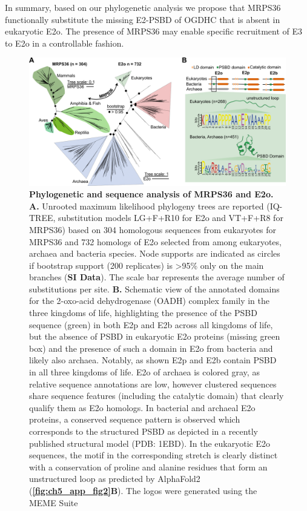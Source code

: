 In summary, based on our phylogenetic analysis we propose that MRPS36 functionally substitute the missing E2-PSBD of OGDHC that is absent in eukaryotic E2o. The presence of MRPS36 may enable specific recruitment of E3 to E2o in a controllable fashion.
\raggedbottom
\begin{figure}[b!]
    \centering
    \includegraphics[]{Chapter.5/Figures/Figure3.png}
    \caption{\textbf{Phylogenetic and sequence analysis of MRPS36 and E2o.} \textbf{A.} Unrooted maximum likelihood phylogeny trees are reported (IQ-TREE, substitution models LG+F+R10 for E2o and VT+F+R8 for MRPS36) based on 304 homologous sequences from eukaryotes for MRPS36 and 732 homologs of E2o selected from among eukaryotes, archaea and bacteria species. Node supports are indicated as circles if bootstrap support (200 replicates) is >95\% only on the main branches (\textbf{SI Data}). The scale bar represents the average number of substitutions per site. \textbf{B.} Schematic view of the annotated domains for the 2-oxo-acid dehydrogenase (OADH) complex family in the three kingdoms of life, highlighting the presence of the PSBD sequence (green) in both E2p and E2b across all kingdoms of life, but the absence of PSBD in eukaryotic E2o proteins (missing green box) and the presence of such a domain in E2o from bacteria and likely also archaea. Notably, as shown E2p and E2b contain PSBD in all three kingdoms of life. E2o of archaea is colored gray, as relative sequence annotations are low, however clustered sequences share sequence features (including the catalytic domain) that clearly qualify them as E2o homologs. In bacterial and archaeal E2o proteins, a conserved sequence pattern is observed which corresponds to the structured PSBD as depicted in a recently published structural model \cite{Mande_1996} (PDB: 1EBD). In the eukaryotic E2o sequences, the motif in the corresponding stretch is clearly distinct with a conservation of proline and alanine residues that form an unstructured loop as predicted by AlphaFold2 (\textbf{\autoref{fig:ch5_app_fig2}B}). The logos were generated using the MEME Suite \cite{Bailey_2015}}
    \label{fig:ch5_fig3}
\end{figure}
%
